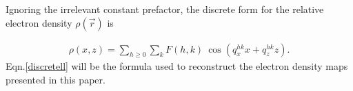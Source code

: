 Ignoring the irrelevant constant prefactor, the discrete form for 
the relative electron density $\rho(\vec{r})$ is 

\begin{eqnarray}
\label{discretell}
\rho(x,z) = \sum_{h \geq 0} \sum_{k} F(h,k) \ \cos(q^{hk}_x x + q^{hk}_z z).
\end{eqnarray}
Eqn.\ref{discretell} will be the formula used to reconstruct the electron 
density maps presented in this paper. 

\pagebreak
